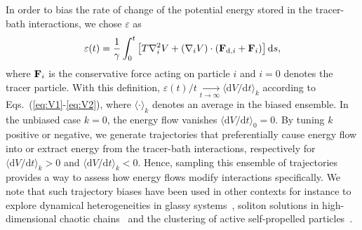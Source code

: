 \documentclass[pre, superscriptaddress, twocolumn,pre]{revtex4-1}
\newcommand{\dd}{\text{d}}
\begin{document}
In order to bias the rate of change of the potential energy stored in the tracer-bath interactions, we chose $\varepsilon$ as
\begin{equation}\label{eq:eps}
	\varepsilon(t) = \frac{1}{\gamma} \int_0^t \left[ T\nabla_i^2 V + (\nabla_i V)\cdot({\bf F}_{{\rm d},i}+{\bf F}_i) \right] \dd s ,
\end{equation}
where ${\bf F}_i$ is the conservative force acting on particle $i$ and $i=0$ denotes the tracer particle. With this definition, $\varepsilon(t)/t \underset{t\to\infty}{\longrightarrow} \langle\dd V/\dd t\rangle_k$ according to Eqs.~(\ref{eq:V1}-\ref{eq:V2}), where $\langle\cdot\rangle_k$ denotes an average in the biased ensemble. In the unbiased case $k=0$, the energy flow vanishes $\langle\dd V/\dd t\rangle_0 = 0$. By tuning $k$ positive or negative, we generate trajectories that preferentially cause energy flow into or extract energy from the tracer-bath interactions, respectively for $\langle\dd V/\dd t\rangle_k>0$ and $\langle\dd V/\dd t\rangle_k<0$. Hence, sampling this ensemble of trajectories provides a way to assess how energy flows modify interactions specifically. We note that such trajectory biases have been used in other contexts for instance to explore dynamical heterogeneities in glassy systems~\cite{garrahan2007,Hedges2009,Pitard2011,Speck2012,Bodineau2012a,Limmer2014,Nemoto2017}, soliton solutions in high-dimensional chaotic chains~\cite{tailleur2007probing,laffargue2013} and the clustering of active self-propelled particles~\cite{Cagnetta2017,Whitelam2018,nemoto2018optimizing}.
\end{document}
